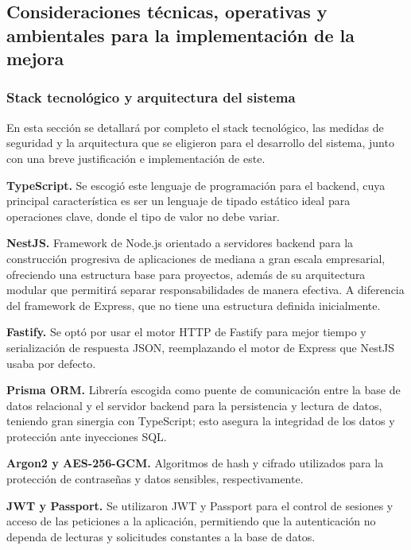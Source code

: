 \clearpage
\subsection{Consideraciones técnicas, operativas y ambientales para la implementación de la mejora}

\subsubsection{Stack tecnológico y arquitectura del sistema}
En esta sección se detallará por completo el stack tecnológico, las medidas de seguridad y la arquitectura que se eligieron para el desarrollo del sistema, 
junto con una breve justificación e implementación de este. 


\textbf{TypeScript.} Se escogió este lenguaje de programación para el backend, cuya principal característica es ser un lenguaje de tipado estático ideal para operaciones clave, 
    donde el tipo de valor no debe variar. \par

\textbf{NestJS.} Framework de Node.js orientado a servidores backend para la construcción progresiva de aplicaciones de mediana a gran escala empresarial, 
    ofreciendo una estructura base para proyectos, además de su arquitectura modular que permitirá separar responsabilidades de manera efectiva. 
    A diferencia del framework de Express, que no tiene una estructura definida inicialmente. \par

\textbf{Fastify.} Se optó por usar el motor HTTP de Fastify para mejor tiempo y serialización de respuesta JSON, 
    reemplazando el motor de Express que NestJS usaba por defecto. \par

\textbf{Prisma ORM.} Librería escogida como puente de comunicación entre la base de datos relacional y el servidor backend para la persistencia y lectura de datos, 
    teniendo gran sinergia con TypeScript; esto asegura la integridad de los datos y protección ante inyecciones SQL. \par

\textbf{Argon2 y AES-256-GCM.} Algoritmos de hash y cifrado utilizados para la protección de contraseñas y datos sensibles, respectivamente. \par

\textbf{JWT y Passport.} Se utilizaron JWT y Passport para el control de sesiones y acceso de las peticiones a la aplicación, 
    permitiendo que la autenticación no dependa de lecturas y solicitudes constantes a la base de datos. \par

